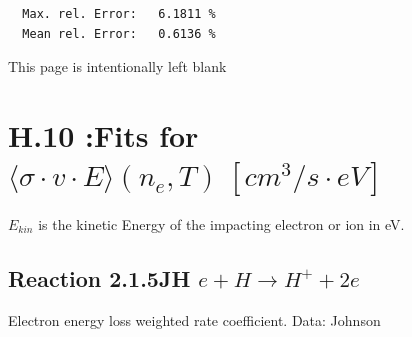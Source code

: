 \documentclass[12pt,dvips]{article}
\begin{document}
\begin{small}
\begin{verbatim}
  Max. rel. Error:   6.1811 %
  Mean rel. Error:   0.6136 %

\end{verbatim}\end{small}



\newpage
This page is intentionally left blank
\newpage
\section{H.10 :Fits for $\langle\sigma \cdot v \cdot E \rangle (n_e,T) \
[cm^3/s \cdot eV]$}

$E_{kin}$ is the kinetic Energy of the impacting electron or ion in eV.

\subsection{
Reaction 2.1.5JH  $ e + H \rightarrow H^+ + 2e $
}

Electron energy loss weighted rate coefficient. Data: Johnson
\end{document}
